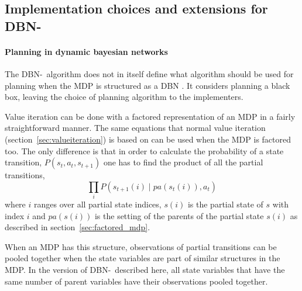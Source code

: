 \subsection{Implementation choices and extensions for DBN-\etre}
\label{sec:e3_our_contribution}

\paragraph{Planning in dynamic bayesian networks}

The DBN-\etre\ algorithm does not in itself define what algorithm should be
used for planning when the MDP is structured as a DBN
\parencite{kearns1999efficient}. It considers planning a black box, leaving the
choice of planning algorithm to the implementers. 

Value iteration can be done with a factored representation of an MDP in a
fairly straightforward manner. The same equations that normal value iteration
(section~\ref{sec:valueiteration}) is based on can be used when the MDP is
factored too. The only difference is that in order to calculate the probability
of a state transition, $P(s_t, a_t, s_{t+1})$ one has to find the product of all the
partial transitions,
\begin{equation}
\prod\limits _{i} P\left(s_{t+1}(i) \mid pa(s_t(i)), a_t\right)
\end{equation}
where $i$ ranges over all partial state indices, $s(i)$ is the partial state of
$s$ with index $i$ and $pa(s(i))$ is the setting of the parents of the partial
state $s(i)$ as described in section~\ref{sec:factored_mdp}.

When an MDP has this structure, observations of partial transitions can be
pooled together when the state variables are part of similar structures in the
MDP. In the version of DBN-\etre\ described here, all state variables that have
the same number of parent variables have their observations pooled together. 


